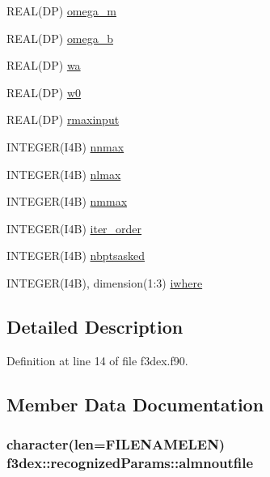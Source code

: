 \begin{DoxyCompactItemize}
REAL(DP) \hyperlink{typef3dex_1_1recognized_params_a2b7f4ea83a970a3c93fa9bdde6f8e0d0}{omega\_\-m}
\item 
REAL(DP) \hyperlink{typef3dex_1_1recognized_params_a7c62dc45475fd29830ae359b36938975}{omega\_\-b}
\item 
REAL(DP) \hyperlink{typef3dex_1_1recognized_params_a31b550edf6d13cdcc677316ca61eb72e}{wa}
\item 
REAL(DP) \hyperlink{typef3dex_1_1recognized_params_a1fefa0da05337ce61c0b29bdc6bdf74f}{w0}
\item 
REAL(DP) \hyperlink{typef3dex_1_1recognized_params_acb096ab9ba6742393d065da8f0616f84}{rmaxinput}
\item 
INTEGER(I4B) \hyperlink{typef3dex_1_1recognized_params_ac6069fd7b6bb17120d36be52d1bea292}{nnmax}
\item 
INTEGER(I4B) \hyperlink{typef3dex_1_1recognized_params_abc9d1823a8586809d2585c9ec2ceb5a4}{nlmax}
\item 
INTEGER(I4B) \hyperlink{typef3dex_1_1recognized_params_abd50eff73fd13cb901529d8ce1d32ced}{nmmax}
\item 
INTEGER(I4B) \hyperlink{typef3dex_1_1recognized_params_a2a6ce96f76b2a0313dfc8a7c2637664f}{iter\_\-order}
\item 
INTEGER(I4B) \hyperlink{typef3dex_1_1recognized_params_a8fb61e9ee4c1d2fa3556ca6984164e5b}{nbptsasked}
\item 
INTEGER(I4B), dimension(1:3) \hyperlink{typef3dex_1_1recognized_params_a16f8233576af14a45b18864b87d0b165}{iwhere}
\end{DoxyCompactItemize}


\subsection{Detailed Description}


Definition at line 14 of file f3dex.f90.



\subsection{Member Data Documentation}
\hypertarget{typef3dex_1_1recognized_params_ad60f17397a0f4d31dbdd893bf3410653}{
\subsubsection[{almnoutfile}]{\setlength{\rightskip}{0pt plus 5cm}character(len=FILENAMELEN) {\bf f3dex::recognizedParams::almnoutfile}}}
\label{typef3dex_1_1recognized_params_ad60f17397a0f4d31dbdd893bf3410653}


